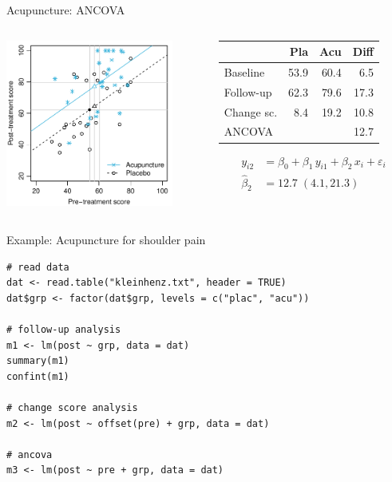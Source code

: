 \documentclass[aspectratio=169]{beamer}
\begin{document}
\begin{frame}{Acupuncture: ANCOVA}
\begin{columns}[T]
\begin{column}{5.5cm}
  \includegraphics[width=5.5cm]{../figures/acu-anco}
\end{column}
%
\begin{column}{5.5cm}
  \vspace*{1em}\small
  \begin{tabular}{lrrr}
  \hline
             &  Pla &  Acu & Diff \\ \hline
  Baseline   & 53.9 & 60.4 &  6.5 \\
  Follow-up  & 62.3 & 79.6 & 17.3 \\
  Change sc. &  8.4 & 19.2 & 10.8 \\
  ANCOVA     &      &      & 12.7 \\ \hline
  \end{tabular}
\begin{align*}
         y_{i2} &= \beta_0 + \beta_1 \, y_{i1} + \beta_2 \, x_i +
                    \varepsilon_i \\
  \hat{\beta}_2 &= 12.7 \; (4.1, 21.3)
\end{align*}
\end{column}
\end{columns}
\end{frame}

\begin{frame}[fragile]{Example: Acupuncture for shoulder pain}
\begin{lstlisting}
# read data
dat <- read.table("kleinhenz.txt", header = TRUE)
dat$grp <- factor(dat$grp, levels = c("plac", "acu"))

# follow-up analysis
m1 <- lm(post ~ grp, data = dat)
summary(m1)
confint(m1)

# change score analysis
m2 <- lm(post ~ offset(pre) + grp, data = dat)

# ancova
m3 <- lm(post ~ pre + grp, data = dat)
\end{lstlisting}
\end{frame}
\end{document}
